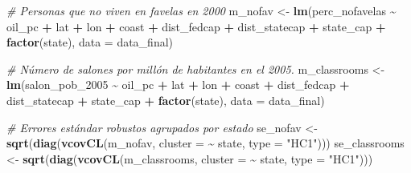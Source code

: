 \documentclass[
]{article}
\newenvironment{Shaded}{\begin{snugshade}}{\end{snugshade}}
\newcommand{\AttributeTok}[1]{\textcolor[rgb]{0.13,0.29,0.53}{#1}}
\newcommand{\CommentTok}[1]{\textcolor[rgb]{0.56,0.35,0.01}{\textit{#1}}}
\newcommand{\FunctionTok}[1]{\textcolor[rgb]{0.13,0.29,0.53}{\textbf{#1}}}
\newcommand{\NormalTok}[1]{#1}
\newcommand{\OtherTok}[1]{\textcolor[rgb]{0.56,0.35,0.01}{#1}}
\newcommand{\SpecialCharTok}[1]{\textcolor[rgb]{0.81,0.36,0.00}{\textbf{#1}}}
\newcommand{\StringTok}[1]{\textcolor[rgb]{0.31,0.60,0.02}{#1}}
\begin{document}
\begin{Shaded}
\begin{Highlighting}[]
\CommentTok{\# Personas que no viven en favelas en 2000}
\NormalTok{m\_nofav }\OtherTok{\textless{}{-}} \FunctionTok{lm}\NormalTok{(perc\_nofavelas }\SpecialCharTok{\textasciitilde{}}\NormalTok{ oil\_pc }\SpecialCharTok{+}\NormalTok{ lat }\SpecialCharTok{+}\NormalTok{ lon }\SpecialCharTok{+}\NormalTok{ coast }\SpecialCharTok{+}\NormalTok{ dist\_fedcap }\SpecialCharTok{+}\NormalTok{ dist\_statecap }\SpecialCharTok{+}\NormalTok{ state\_cap }\SpecialCharTok{+} \FunctionTok{factor}\NormalTok{(state), }\AttributeTok{data =}\NormalTok{ data\_final)}

\CommentTok{\# Número de salones por millón de habitantes en el 2005.}
\NormalTok{m\_classrooms }\OtherTok{\textless{}{-}} \FunctionTok{lm}\NormalTok{(salon\_pob\_2005 }\SpecialCharTok{\textasciitilde{}}\NormalTok{ oil\_pc }\SpecialCharTok{+}\NormalTok{ lat }\SpecialCharTok{+}\NormalTok{ lon }\SpecialCharTok{+}\NormalTok{ coast }\SpecialCharTok{+}\NormalTok{ dist\_fedcap }\SpecialCharTok{+}\NormalTok{ dist\_statecap }\SpecialCharTok{+}\NormalTok{ state\_cap }\SpecialCharTok{+} \FunctionTok{factor}\NormalTok{(state), }\AttributeTok{data =}\NormalTok{ data\_final)}

\CommentTok{\# Errores estándar robustos agrupados por estado}
\NormalTok{se\_nofav      }\OtherTok{\textless{}{-}} \FunctionTok{sqrt}\NormalTok{(}\FunctionTok{diag}\NormalTok{(}\FunctionTok{vcovCL}\NormalTok{(m\_nofav, }\AttributeTok{cluster =} \SpecialCharTok{\textasciitilde{}}\NormalTok{ state, }\AttributeTok{type =} \StringTok{"HC1"}\NormalTok{)))}
\NormalTok{se\_classrooms }\OtherTok{\textless{}{-}} \FunctionTok{sqrt}\NormalTok{(}\FunctionTok{diag}\NormalTok{(}\FunctionTok{vcovCL}\NormalTok{(m\_classrooms, }\AttributeTok{cluster =} \SpecialCharTok{\textasciitilde{}}\NormalTok{ state, }\AttributeTok{type =} \StringTok{"HC1"}\NormalTok{)))}


\end{Highlighting}
\end{Shaded}
\end{document}
